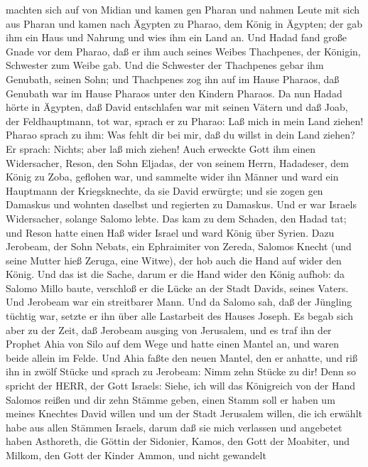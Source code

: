 machten sich auf von Midian und kamen gen Pharan und nahmen Leute mit
sich aus Pharan und kamen nach Ägypten zu Pharao, dem König in Ägypten;
der gab ihm ein Haus und Nahrung und wies ihm ein Land an. 
Und Hadad fand große Gnade vor dem Pharao, daß er ihm auch seines Weibes
Thachpenes, der Königin, Schwester zum Weibe gab.  Und die
Schwester der Thachpenes gebar ihm Genubath, seinen Sohn; und Thachpenes
zog ihn auf im Hause Pharaos, daß Genubath war im Hause Pharaos unter
den Kindern Pharaos.  Da nun Hadad hörte in Ägypten, daß
David entschlafen war mit seinen Vätern und daß Joab, der Feldhauptmann,
tot war, sprach er zu Pharao: Laß mich in mein Land ziehen!
 Pharao sprach zu ihm: Was fehlt dir bei mir, daß du willst
in dein Land ziehen? Er sprach: Nichts; aber laß mich ziehen!
 Auch erweckte Gott ihm einen Widersacher, Reson, den Sohn
Eljadas, der von seinem Herrn, Hadadeser, dem König zu Zoba, geflohen
war,  und sammelte wider ihn Männer und ward ein Hauptmann
der Kriegsknechte, da sie David erwürgte; und sie zogen gen Damaskus und
wohnten daselbst und regierten zu Damaskus.  Und er war
Israels Widersacher, solange Salomo lebte. Das kam zu dem Schaden, den
Hadad tat; und Reson hatte einen Haß wider Israel und ward König über
Syrien.  Dazu Jerobeam, der Sohn Nebats, ein Ephraimiter
von Zereda, Salomos Knecht (und seine Mutter hieß Zeruga, eine Witwe),
der hob auch die Hand auf wider den König.  Und das ist die
Sache, darum er die Hand wider den König aufhob: da Salomo Millo baute,
verschloß er die Lücke an der Stadt Davids, seines Vaters. 
Und Jerobeam war ein streitbarer Mann. Und da Salomo sah, daß der
Jüngling tüchtig war, setzte er ihn über alle Lastarbeit des Hauses
Joseph.  Es begab sich aber zu der Zeit, daß Jerobeam
ausging von Jerusalem, und es traf ihn der Prophet Ahia von Silo auf dem
Wege und hatte einen Mantel an, und waren beide allein im Felde.
 Und Ahia faßte den neuen Mantel, den er anhatte, und riß
ihn in zwölf Stücke  und sprach zu Jerobeam: Nimm zehn
Stücke zu dir! Denn so spricht der HERR, der Gott Israels: Siehe, ich
will das Königreich von der Hand Salomos reißen und dir zehn Stämme
geben,  einen Stamm soll er haben um meines Knechtes David
willen und um der Stadt Jerusalem willen, die ich erwählt habe aus allen
Stämmen Israels,  darum daß sie mich verlassen und
angebetet haben Asthoreth, die Göttin der Sidonier, Kamos, den Gott der
Moabiter, und Milkom, den Gott der Kinder Ammon, und nicht gewandelt
